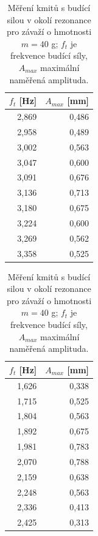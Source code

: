 \documentclass[english]{article}
\begin{document}
\begin{table}[h]
\parbox{.45\linewidth}{
\centering
\begin{tabular}{|r|r|}
\hline
	$f_t$ [Hz] & $A_{max}$ [mm] \\\hline\hline
	2,869 & 0,486 \\\hline
	2,958 & 0,489 \\\hline
	3,002 & 0,563 \\\hline
	3,047 & 0,600 \\\hline
	3,091 & 0,676 \\\hline
	3,136 & 0,713 \\\hline
	3,180 & 0,675 \\\hline
	3,224 & 0,600 \\\hline
	3,269 & 0,562 \\\hline
	3,358 & 0,525 \\\hline
	
\end{tabular}
\caption{Měření kmitů s budící silou v okolí rezonance pro závaží o hmotnosti $m=20$ g; $f_t$ je frekvence budící síly, $A_{max}$ maximální naměřená amplituda.}
\label{tab:lho_rezonance_20}
}
\hfill
\parbox{.45\linewidth}{
\centering
\begin{tabular}{|r|r|}
\hline
	$f_t$ [Hz] & $A_{max}$ [mm] \\ \hline \hline
	1,626 & 0,338 \\\hline
	1,715 & 0,525 \\\hline
	1,804 & 0,563 \\\hline
	1,892 & 0,675 \\\hline
	1,981 & 0,783 \\\hline
	2,070 & 0,788 \\\hline
	2,159 & 0,638 \\\hline
	2,248 & 0,563 \\\hline
	2,336 & 0,413 \\\hline
	2,425 & 0,313 \\\hline			
\end{tabular}
\caption{Měření kmitů s budící silou v okolí rezonance pro závaží o hmotnosti $m=40$ g; $f_t$ je frekvence budící síly, $A_{max}$ maximální naměřená amplituda. }
\label{tab:lho_rezonance_40}

}

\end{table}
\end{document}

